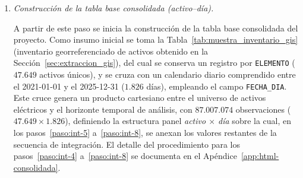 {\begin{enumerate}
\begin{itemize}
            \item \textit{Actual (Sección~\ref{sec:extraccion_oms_actual} -- OMS SP7):} cruce por \texttt{MANIOBRA\_APERTURA} $\leftrightarrow$ \texttt{ID\_EVENTO} para completar \texttt{ELEMENTO\_FALLADO} con el valor de \texttt{ELEMENTO\_FALLA}, junto con \texttt{TIPO\_ELEMENTO}, en eventos del periodo post-migración.
        \end{itemize}
    
        \item\label{paso:int-4} \textit{Construcción de la tabla base consolidada (activo--día).}\mbox{}\par\vspace{0.2em}\noindent
        A partir de este paso se inicia la construcción de la tabla base consolidada del proyecto. Como insumo inicial se toma la Tabla~\ref{tab:muestra_inventario_gis} (inventario georreferenciado de activos obtenido en la Sección~\ref{sec:extraccion_gis}), del cual se conserva un registro por \texttt{ELEMENTO} ($47{.}649$ activos únicos), y se cruza con un calendario diario comprendido entre el 2021-01-01 y el 2025-12-31 ($1{.}826$ días), empleando el campo \texttt{FECHA\_DIA}. Este cruce genera un producto cartesiano entre el universo de activos eléctricos y el horizonte temporal de análisis, con $87{.}007{.}074$ observaciones ($47{.}649 \times 1{.}826$), definiendo la estructura panel \textit{activo $\times$ día} sobre la cual, en los pasos~\ref{paso:int-5} a~\ref{paso:int-8}, se anexan los valores restantes de la secuencia de integración. El detalle del procedimiento para los pasos~\ref{paso:int-4} a~\ref{paso:int-8} se documenta en el Apéndice~\ref{app:html-consolidada}.
    

\end{enumerate}}
